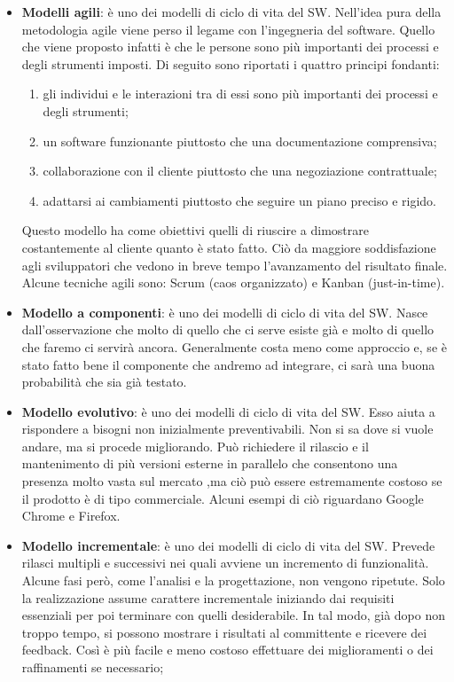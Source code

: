 \begin{itemize}
	\item \textbf{Modelli agili}: è uno dei modelli di ciclo di vita del SW. \newline
Nell'idea pura della metodologia agile viene perso il legame con l'ingegneria del software.
Quello che viene proposto infatti è che le persone sono più importanti dei processi e degli strumenti imposti. Di seguito sono riportati i quattro principi fondanti:
		\begin{enumerate}
			\item gli individui e le interazioni tra di essi sono più importanti dei processi e degli strumenti;
			\item un software funzionante piuttosto che una documentazione comprensiva;
			\item collaborazione con il cliente piuttosto che una negoziazione contrattuale;
			\item adattarsi ai cambiamenti piuttosto che seguire un piano preciso e rigido.
		\end{enumerate}
Questo modello ha come obiettivi quelli di riuscire a dimostrare costantemente al cliente quanto è stato fatto. Ciò da maggiore soddisfazione agli sviluppatori che vedono in breve tempo l'avanzamento del risultato finale. \newline
Alcune tecniche agili sono: Scrum (caos organizzato) e Kanban (just-in-time).

	\item \textbf{Modello a componenti}: è uno dei modelli di ciclo di vita del SW. Nasce dall'osservazione che molto di quello che ci serve esiste già e molto di quello che faremo ci servirà ancora. \newline
Generalmente costa meno come approccio e, se è stato fatto bene il componente che andremo ad integrare, ci sarà una buona probabilità che sia già testato.

	\item \textbf{Modello evolutivo}: è uno dei modelli di ciclo di vita del SW. Esso aiuta a rispondere a bisogni non inizialmente preventivabili. Non si sa dove si vuole andare, ma si procede migliorando. \newline
Può richiedere il rilascio e il mantenimento di più versioni esterne in parallelo che consentono una presenza molto vasta sul mercato ,ma ciò può essere estremamente costoso se il prodotto è di tipo commerciale. Alcuni esempi di ciò riguardano Google Chrome e Firefox.

	\item \textbf{Modello incrementale}: è uno dei modelli di ciclo di vita del SW. Prevede rilasci multipli e successivi nei quali avviene un incremento di funzionalità. \newline
Alcune fasi però, come l'analisi e la progettazione, non vengono ripetute. Solo la realizzazione assume carattere incrementale iniziando dai requisiti essenziali per poi terminare con quelli desiderabile. In tal modo, già dopo non troppo tempo, si possono mostrare i risultati al committente e ricevere dei feedback. \newline
Così è più facile e meno costoso effettuare dei miglioramenti o dei raffinamenti se necessario;


\end{itemize}
